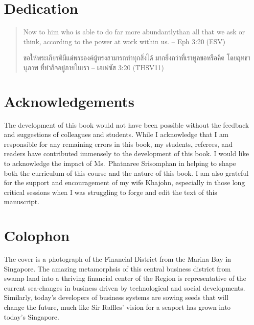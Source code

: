 \documentclass[]{book}
\newcommand{\tai}{\fontspec[Scale=1.3]{[THSarabunNew.ttf:script=thai]}}
\begin{document}
\hypertarget{dedication}{%
\section*{Dedication}\label{dedication}}

\begin{quote}
Now to him who is able to do far more abundantly\newline than all that we ask or think, according \newline to the power at work within us. \newline -- Eph 3:20 (ESV)

\tai ขอให้พระเกียรติมีแด่พระองค์ผู้ทรงสามารถทำทุกสิ่งได้ \newline มากยิ่งกว่าที่เราทูลขอหรือคิด โดยฤทธานุภาพ \newline ที่ทำกิจอยู่ภายในเรา \newline -- เอเฟซัส 3:20 (THSV11)
\end{quote}

\hypertarget{acknowledgements}{%
\section*{Acknowledgements}\label{acknowledgements}}

The development of this book would not have been possible without the feedback and suggestions of colleagues and students. While I acknowledge that I am responsible for any remaining errors in this book, my students, referees, and readers have contributed immensely to the development of this book. I would like to acknowledge the impact of Ms.~Phatnaree Srisomphan in helping to shape both the curriculum of this course and the nature of this book. I am also grateful for the support and encouragement of my wife Khajohn, especially in those long critical sessions when I was struggling to forge and edit the text of this manuscript.

\hypertarget{colophon}{%
\section*{Colophon}\label{colophon}}

The cover is a photograph of the Financial District from the Marina Bay in Singapore. The amazing metamorphsis of this central business district from swamp land into a thriving financial center of the Region is representative of the current sea-changes in business driven by technological and social developments. Similarly, today's developers of business systems are sowing seeds that will change the future, much like Sir Raffles' vision for a seaport has grown into today's Singapore.
\end{document}
